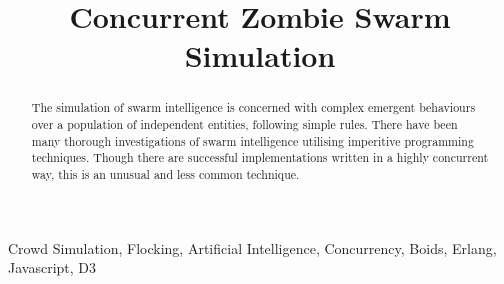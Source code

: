 \documentclass[10pt, a4paper, conference, compsocconf]{IEEEtran}
\begin{document}
\title{Concurrent Zombie Swarm Simulation}

\author{
\and
{}
\and
{}
}
\maketitle

\begin{abstract}
The simulation of swarm intelligence is concerned with complex emergent behaviours over a population of independent entities, following simple rules. There have been many thorough investigations of swarm intelligence utilising imperitive programming techniques. Though there are successful implementations written in a highly concurrent way, this is an unusual and less common technique.
\end{abstract}
\begin{IEEEkeywords}
Crowd Simulation, Flocking, Artificial Intelligence, Concurrency, Boids, Erlang, Javascript, D3
\end{IEEEkeywords}
\end{document}
